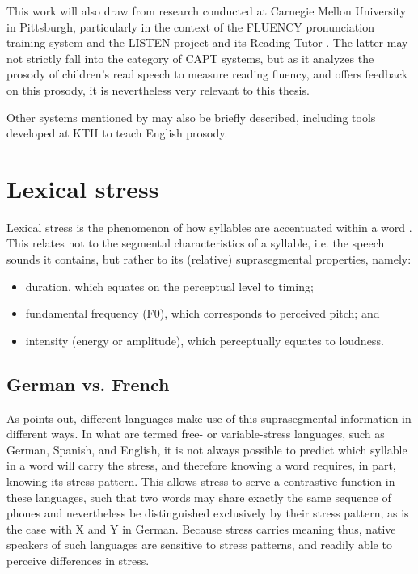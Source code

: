 	This work will also draw from research conducted at Carnegie Mellon University in Pittsburgh, particularly in the context of the FLUENCY pronunciation training system \cite{Eskenazi1998,Probst2002} and the LISTEN project and its Reading Tutor \citep{Duong2011,Mostow2012,Mostow1999,Sitaram2011,Weber2010}. The latter may not strictly fall into the category of CAPT systems, but as it analyzes the prosody of children's read speech to measure reading fluency, and offers feedback on this prosody, it is nevertheless very relevant to this thesis.
	
	Other systems mentioned by \textcite{Eskenazi2009,Delmonte2011,Witt2012} may also be briefly described, including tools developed at KTH \citep{Hincks2002,Hincks2009} to teach English prosody.
	
	
 \section{Lexical stress}
 \label{sec:bkgd:stress}
			Lexical stress is the phenomenon of how syllables are accentuated within a word  \citep{Cutler2005}. This relates not to the segmental characteristics of a syllable, i.e. the speech sounds it contains, but rather to its (relative) suprasegmental properties, namely: %
			\begin{itemize}
			\item duration, which equates on the perceptual level to timing;
			\item fundamental frequency (F0), which corresponds to perceived pitch; and
			\item intensity (energy or amplitude), which perceptually equates to loudness.
			\end{itemize}

		
		\subsection{German vs. French}
		\label{sec:stress:GvF}
		
					As \textcite{Cutler2005} points out, different languages make use of this suprasegmental information in different ways. 
			In what are termed free- or variable-stress languages, such as German, Spanish, and English, it is not always possible to predict which syllable in a word will carry the stress, and therefore knowing a word requires, in part, knowing its stress pattern. This allows stress to serve a contrastive function in these languages, such that two words may share exactly the same sequence of phones and nevertheless be distinguished exclusively by their stress pattern, as is the case with X and Y in German. %
Because stress carries meaning thus, native speakers of such languages are sensitive to stress patterns, and readily able to perceive differences in stress. %

